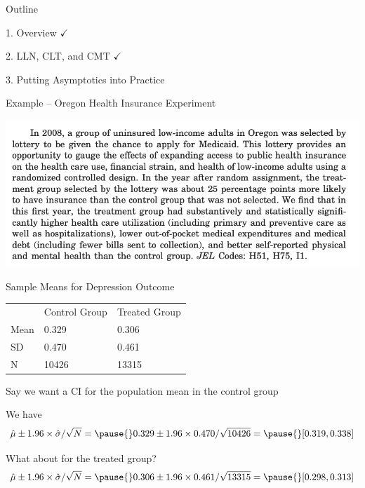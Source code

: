 \documentclass[11pt,english,handout]{beamer}
\newenvironment{wideitemize}{\itemize\addtolength{\itemsep}{10pt}}{\enditemize}
\begin{document}
\begin{frame}{Outline}

\textcolor{red!75!green!50!blue!25!gray}{1. Overview} $\checkmark$
\vspace{0.8cm}

\textcolor{red!75!green!50!blue!25!gray}{2. LLN, CLT, and CMT} $\checkmark$
\vspace{0.8cm}

3. Putting Asymptotics into Practice

\end{frame}

\begin{frame}{Example -- Oregon Health Insurance Experiment}
	
\begin{center}
\includegraphics[width = 0.9 \linewidth]{ohie-abstract}	
\end{center}
\end{frame}


\begin{frame}{Sample Means for Depression Outcome}

\begin{tabular}{lll}
 & Control Group & Treated Group \\
 Mean & 0.329 & 0.306\\
 SD & 0.470 &  0.461 \\
 N & 10426 & 13315  
\end{tabular}

\pause
\begin{wideitemize}
	\item
	Say we want a CI for the population mean in the control group
	\pause
	\item
	We have $$\hat\mu \pm 1.96 \times \hat\sigma / \sqrt{N} = \pause{} 0.329 \pm 1.96 \times 0.470 / \sqrt{10426} =  \pause{} [0.319, 0.338] $$
	
	\pause
	\item
	What about for the treated group? 
	\pause
	$$\hat\mu \pm 1.96 \times  \hat\sigma / \sqrt{N} = \pause{} 0.306 \pm 1.96 \times 0.461 / \sqrt{13315} =  \pause{} [0.298, 0.313] $$
\end{wideitemize}

\end{frame}
\end{document}
